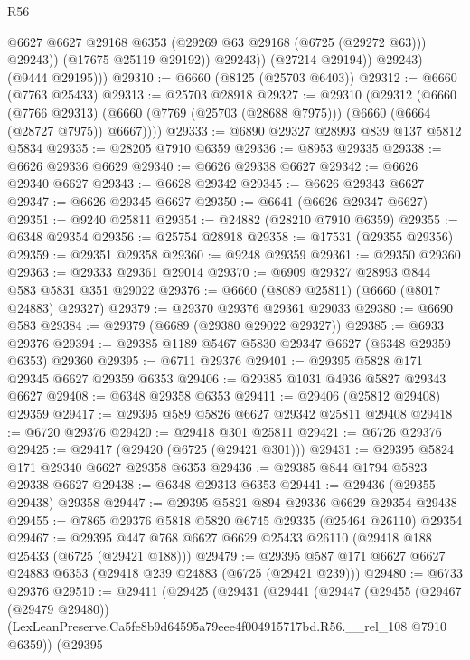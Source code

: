 \begin{lexlean}{R56}
\begin{coremodule}
                      @6627
                      @6627
                      @29168
                      @6353
                      (@29269 @63 @29168 (@6725 (@29272 @63)))
                      @29243))
                  (@17675 @25119 @29192))
                @29243))
            (@27214 @29194))
          @29243)
        (@9444 @29195)))
@29310 := @6660 (@8125 (@25703 @6403))
@29312 := @6660 (@7763 @25433)
@29313 := @25703 @28918
@29327 := @29310
    (@29312
      (@6660
        (@7766 @29313)
        (@6660 (@7769 (@25703 (@28688 @7975))) (@6660 (@6664 (@28727 @7975)) @6667))))
@29333 := @6890 @29327 @28993 @839 @137 @5812 @5834
@29335 := @28205 @7910 @6359
@29336 := @8953 @29335
@29338 := @6626 @29336 @6629
@29340 := @6626 @29338 @6627
@29342 := @6626 @29340 @6627
@29343 := @6628 @29342
@29345 := @6626 @29343 @6627
@29347 := @6626 @29345 @6627
@29350 := @6641 (@6626 @29347 @6627)
@29351 := @9240 @25811
@29354 := @24882 (@28210 @7910 @6359)
@29355 := @6348 @29354
@29356 := @25754 @28918
@29358 := @17531 (@29355 @29356)
@29359 := @29351 @29358
@29360 := @9248 @29359
@29361 := @29350 @29360
@29363 := @29333 @29361 @29014
@29370 := @6909 @29327 @28993 @844 @583 @5831 @351 @29022
@29376 := @6660 (@8089 @25811) (@6660 (@8017 @24883) @29327)
@29379 := @29370 @29376 @29361 @29033
@29380 := @6690 @583
@29384 := @29379 (@6689 (@29380 @29022 @29327))
@29385 := @6933 @29376
@29394 := @29385 @1189 @5467 @5830 @29347 @6627 (@6348 @29359 @6353) @29360
@29395 := @6711 @29376
@29401 := @29395 @5828 @171 @29345 @6627 @29359 @6353
@29406 := @29385 @1031 @4936 @5827 @29343 @6627
@29408 := @6348 @29358 @6353
@29411 := @29406 (@25812 @29408) @29359
@29417 := @29395 @589 @5826 @6627 @29342 @25811 @29408
@29418 := @6720 @29376
@29420 := @29418 @301 @25811
@29421 := @6726 @29376
@29425 := @29417 (@29420 (@6725 (@29421 @301)))
@29431 := @29395 @5824 @171 @29340 @6627 @29358 @6353
@29436 := @29385 @844 @1794 @5823 @29338 @6627
@29438 := @6348 @29313 @6353
@29441 := @29436 (@29355 @29438) @29358
@29447 := @29395 @5821 @894 @29336 @6629 @29354 @29438
@29455 := @7865 @29376 @5818 @5820 @6745 @29335 (@25464 @26110) @29354
@29467 := @29395 @447 @768 @6627 @6629 @25433 @26110 (@29418 @188 @25433 (@6725 (@29421 @188)))
@29479 := @29395 @587 @171 @6627 @6627 @24883 @6353 (@29418 @239 @24883 (@6725 (@29421 @239)))
@29480 := @6733 @29376
@29510 := @29411
    (@29425
      (@29431
        (@29441
          (@29447
            (@29455
              (@29467 (@29479 @29480))
              (LexLeanPreserve.Ca5fe8b9d64595a79eee4f004915717bd.R56.__rel_108 @7910 @6359))
            (@29395

\end{coremodule}
\end{lexlean}
